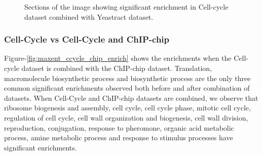 \begin{figure}[p]
\centering
{}
\caption{Sections of the image showing significant enrichment in Cell-cycle dataset combined with Yeastract dataset.}
\label{fig:maxent_ccycle_yt_enrich}
\end{figure}

\subsubsection{Cell-Cycle vs Cell-Cycle and ChIP-chip}
Figure-\ref{fig:maxent_ccycle_chip_enrich} shows the enrichments when the Cell-cycle dataset is combined with the ChIP-chip dataset. 
Translation, macromolecule biosynthetic process and biosynthetic process are the only three common significant enrichments observed 
both before and after combination of datasets. When Cell-Cycle and ChIP-chip datasets are combined, we observe that ribosome biogenesis and assembly, 
cell cycle, cell cycle phase, mitotic cell cycle, regulation of 
cell cycle, cell wall organization and biogenesis, cell wall division, reproduction, conjugation, response to pheromone, organic 
acid metabolic process, amine metabolic process and response to stimulus processes have significant enrichments. 

